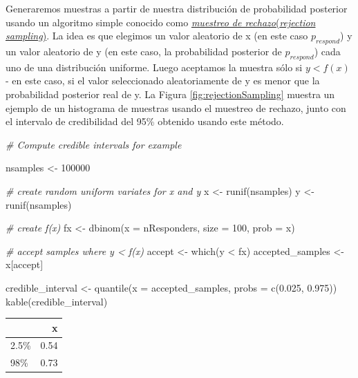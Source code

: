 \documentclass[
  12pt,
]{book}
\newenvironment{Shaded}{\begin{snugshade}}{\end{snugshade}}
\newcommand{\AttributeTok}[1]{\textcolor[rgb]{0.77,0.63,0.00}{#1}}
\newcommand{\CommentTok}[1]{\textcolor[rgb]{0.56,0.35,0.01}{\textit{#1}}}
\newcommand{\DecValTok}[1]{\textcolor[rgb]{0.00,0.00,0.81}{#1}}
\newcommand{\FloatTok}[1]{\textcolor[rgb]{0.00,0.00,0.81}{#1}}
\newcommand{\FunctionTok}[1]{\textcolor[rgb]{0.00,0.00,0.00}{#1}}
\newcommand{\NormalTok}[1]{#1}
\newcommand{\OtherTok}[1]{\textcolor[rgb]{0.56,0.35,0.01}{#1}}
\newcommand{\SpecialCharTok}[1]{\textcolor[rgb]{0.00,0.00,0.00}{#1}}
\begin{document}
Generaremos muestras a partir de nuestra distribución de probabilidad posterior usando un algoritmo simple conocido como \href{https://am207.github.io/2017/wiki/rejectionsampling.html}{\emph{muestreo de rechazo}(\emph{rejection sampling})}. La idea es que elegimos un valor aleatorio de x (en este caso \(p_{respond}\)) y un valor aleatorio de y (en este caso, la probabilidad posterior de \(p_{respond}\)) cada uno de una distribución uniforme. Luego aceptamos la muestra sólo si \(y < f(x)\) - en este caso, si el valor seleccionado aleatoriamente de y es menor que la probabilidad posterior real de y. La Figura \ref{fig:rejectionSampling} muestra un ejemplo de un histograma de muestras usando el muestreo de rechazo, junto con el intervalo de credibilidad del 95\% obtenido usando este método.

\begin{Shaded}
\begin{Highlighting}[]
\CommentTok{\# Compute credible intervals for example}

\NormalTok{nsamples }\OtherTok{\textless{}{-}} \DecValTok{100000}

\CommentTok{\# create random uniform variates for x and y}
\NormalTok{x }\OtherTok{\textless{}{-}} \FunctionTok{runif}\NormalTok{(nsamples)}
\NormalTok{y }\OtherTok{\textless{}{-}} \FunctionTok{runif}\NormalTok{(nsamples)}

\CommentTok{\# create f(x)}
\NormalTok{fx }\OtherTok{\textless{}{-}} \FunctionTok{dbinom}\NormalTok{(}\AttributeTok{x =}\NormalTok{ nResponders, }\AttributeTok{size =} \DecValTok{100}\NormalTok{, }\AttributeTok{prob =}\NormalTok{ x)}

\CommentTok{\# accept samples where y \textless{} f(x)}
\NormalTok{accept }\OtherTok{\textless{}{-}} \FunctionTok{which}\NormalTok{(y }\SpecialCharTok{\textless{}}\NormalTok{ fx)}
\NormalTok{accepted\_samples }\OtherTok{\textless{}{-}}\NormalTok{ x[accept]}

\NormalTok{credible\_interval }\OtherTok{\textless{}{-}} \FunctionTok{quantile}\NormalTok{(}\AttributeTok{x =}\NormalTok{ accepted\_samples, }
                              \AttributeTok{probs =} \FunctionTok{c}\NormalTok{(}\FloatTok{0.025}\NormalTok{, }\FloatTok{0.975}\NormalTok{))}
\FunctionTok{kable}\NormalTok{(credible\_interval)}
\end{Highlighting}
\end{Shaded}

\begin{tabular}{l|r}
\hline
  & x\\
\hline
2.5\% & 0.54\\
\hline
98\% & 0.73\\
\hline
\end{tabular}
\end{document}
